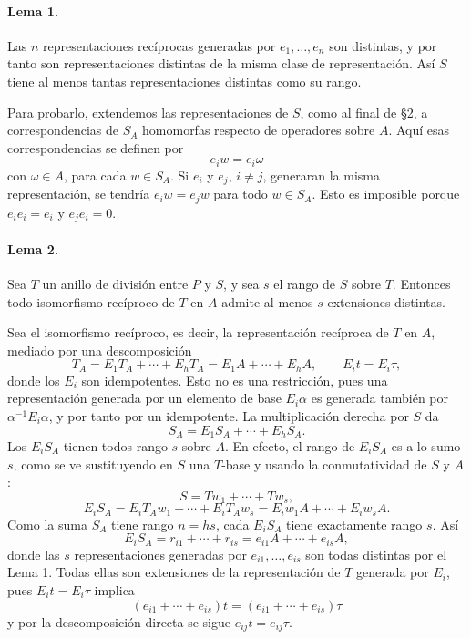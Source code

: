\paragraph{Lema 1.}
Las \(n\) representaciones recíprocas generadas por \(e_1,\ldots,e_n\) son distintas, y por tanto son representaciones distintas de la misma clase de representación. Así \(S\) tiene al menos tantas representaciones distintas como su rango.

Para probarlo, extendemos las representaciones de \(S\), como al final de §2, a correspondencias de \(S_A\) homomorfas respecto de operadores sobre \(A\). Aquí esas correspondencias se definen por
\[
        e_iw=e_i\omega
\]
con \(\omega\in A\), para cada \(w\in S_A\). Si \(e_i\) y \(e_j\), \(i\ne j\), generaran la misma representación, se tendría \(e_iw=e_jw\) para todo \(w\in S_A\). Esto es imposible porque \(e_ie_i=e_i\) y \(e_je_i=0\).

\paragraph{Lema 2.}
Sea \(T\) un anillo de división entre \(P\) y \(S\), y sea \(s\) el rango de \(S\) sobre \(T\). Entonces todo isomorfismo recíproco de \(T\) en \(A\) admite al menos \(s\) extensiones distintas.

Sea el isomorfismo recíproco, es decir, la representación recíproca de \(T\) en \(A\), mediado por una descomposición
\[
        T_A=E_1T_A+\cdots+E_hT_A
            =E_1A+\cdots+E_hA,
        \qquad E_it=E_i\tau,
\]
donde los \(E_i\) son idempotentes. Esto no es una restricción, pues una representación generada por un elemento de base \(E_i\alpha\) es generada también por \(\alpha^{-1}E_i\alpha\), y por tanto por un idempotente. La multiplicación derecha por \(S\) da
\[
        S_A=E_1S_A+\cdots+E_hS_A .
\]
Los \(E_iS_A\) tienen todos rango \(s\) sobre \(A\). En efecto, el rango de \(E_iS_A\) es a lo sumo \(s\), como se ve sustituyendo en \(S\) una \(T\)-base y usando la conmutatividad de \(S\) y \(A\):
\[
        S=Tw_1+\cdots+Tw_s,
\]
\[
        E_iS_A=E_iT_Aw_1+\cdots+E_iT_Aw_s
              =E_iw_1A+\cdots+E_iw_sA .
\]
Como la suma \(S_A\) tiene rango \(n=hs\), cada \(E_iS_A\) tiene exactamente rango \(s\). Así
\[
        E_iS_A=r_{i1}+\cdots+r_{is}
              =e_{i1}A+\cdots+e_{is}A,
\]
donde las \(s\) representaciones generadas por \(e_{i1},\ldots,e_{is}\) son todas distintas por el Lema 1. Todas ellas son extensiones de la representación de \(T\) generada por \(E_i\), pues \(E_it=E_i\tau\) implica
\[
        (e_{i1}+\cdots+e_{is})t=(e_{i1}+\cdots+e_{is})\tau
\]
y por la descomposición directa se sigue \(e_{ij}t=e_{ij}\tau\).

